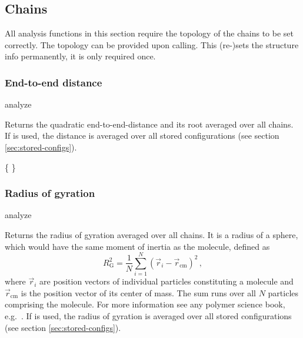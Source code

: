 \subsection{Chains}

All analysis functions in this section require the topology of the
chains to be set correctly.  The topology can be provided upon
calling. This (re-)sets the structure info permanently, \ie it is only
required once.

\subsubsection{End-to-end distance}
\begin{pysyntax}
\end{pysyntax}
\begin{essyntax}
  analyze  
\end{essyntax}
Returns the quadratic end-to-end-distance and its root averaged over
all chains.  If  is used, the distance is averaged over all
stored configurations (see section \vref{sec:stored-configs}).

\begin{code}
\{     \}
\end{code}

\subsubsection{Radius of gyration}
\begin{pysyntax}
\end{pysyntax}
\begin{essyntax}
  analyze  
\end{essyntax}

Returns the radius of gyration averaged over all chains. It is a radius
of a sphere, which would have the same moment of inertia as the molecule, 
defined as
\begin{equation}
\label{eq:Rg}
R_{\mathrm G}^2 = \frac{1}{N} \sum\limits_{i=1}^{N} \left(\vec r_i - \vec r_{\mathrm{cm}}\right)^2\,,
\end{equation}
where $\vec r_i$ are position vectors of individual particles constituting a molecule
and $\vec r_{\mathrm{cm}}$ is the position vector of its center of mass. The sum runs
over all $N$ particles comprising the molecule. For more information see
any polymer science book, e.g.~\cite{rubinstein03a}.
If  is used, the radius of gyration is averaged over all stored
configurations (see section \vref{sec:stored-configs}).

